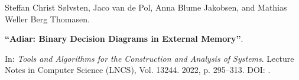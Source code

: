 Steffan Christ Sølvsten, Jaco van de Pol, Anna Blume Jakobsen, and Mathias Weller Berg Thomasen.

{\bf ``Adiar: Binary Decision Diagrams in External Memory''}.

In: \emph{Tools and Algorithms for the Construction and Analysis of Systems}.
Lecture Notes in Computer Science (LNCS), Vol. 13244. 2022, p. 295--313.
DOI: .

\label{cite:2022.tacas}
